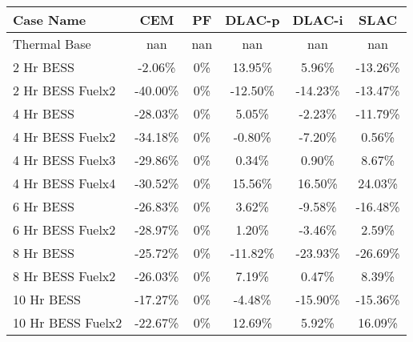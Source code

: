 \begin{tabular}{lccccc}
\toprule
Case Name & CEM & PF & DLAC-p & DLAC-i & SLAC \\
\midrule
Thermal Base & nan & nan & nan & nan & nan \\
2 Hr BESS & -2.06\% & 0\% & 13.95\% & 5.96\% & -13.26\% \\
2 Hr BESS Fuelx2 & -40.00\% & 0\% & -12.50\% & -14.23\% & -13.47\% \\
4 Hr BESS & -28.03\% & 0\% & 5.05\% & -2.23\% & -11.79\% \\
4 Hr BESS Fuelx2 & -34.18\% & 0\% & -0.80\% & -7.20\% & 0.56\% \\
4 Hr BESS Fuelx3 & -29.86\% & 0\% & 0.34\% & 0.90\% & 8.67\% \\
4 Hr BESS Fuelx4 & -30.52\% & 0\% & 15.56\% & 16.50\% & 24.03\% \\
6 Hr BESS & -26.83\% & 0\% & 3.62\% & -9.58\% & -16.48\% \\
6 Hr BESS Fuelx2 & -28.97\% & 0\% & 1.20\% & -3.46\% & 2.59\% \\
8 Hr BESS & -25.72\% & 0\% & -11.82\% & -23.93\% & -26.69\% \\
8 Hr BESS Fuelx2 & -26.03\% & 0\% & 7.19\% & 0.47\% & 8.39\% \\
10 Hr BESS & -17.27\% & 0\% & -4.48\% & -15.90\% & -15.36\% \\
10 Hr BESS Fuelx2 & -22.67\% & 0\% & 12.69\% & 5.92\% & 16.09\% \\
\bottomrule
\end{tabular}
